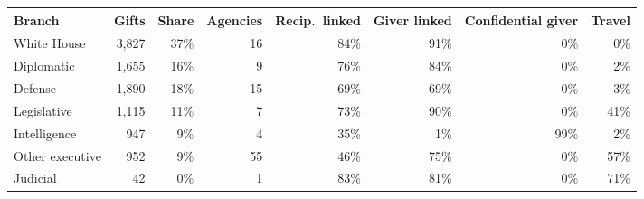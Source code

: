 \begin{tabular}{lrrrrrrr}
\toprule
Branch & Gifts & Share & Agencies & Recip.\ linked & Giver linked & Confidential giver & Travel \\
\midrule
White House & 3,827 & 37\% & 16 & 84\% & 91\% & 0\% & 0\% \\
Diplomatic & 1,655 & 16\% & 9 & 76\% & 84\% & 0\% & 2\% \\
Defense & 1,890 & 18\% & 15 & 69\% & 69\% & 0\% & 3\% \\
Legislative & 1,115 & 11\% & 7 & 73\% & 90\% & 0\% & 41\% \\
Intelligence & 947 & 9\% & 4 & 35\% & 1\% & 99\% & 2\% \\
Other executive & 952 & 9\% & 55 & 46\% & 75\% & 0\% & 57\% \\
Judicial & 42 & 0\% & 1 & 83\% & 81\% & 0\% & 71\% \\
\bottomrule
\end{tabular}
